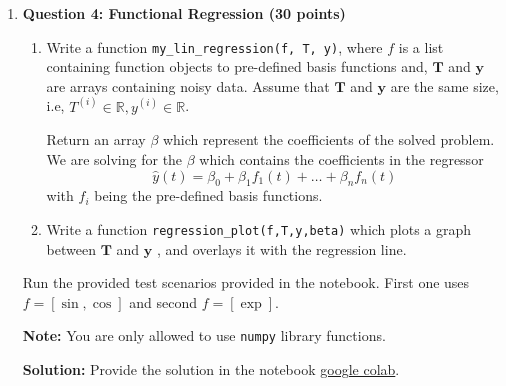 \documentclass[11pt,letterpaper]{article}
\begin{document}
\begin{enumerate}
\begin{enumerate}[label=(\alph*)]
    \emph{Hint}: Minimize least squares in log-space, i.e. $\min \sum_i (\log(\hat{y_i}) - \log(y_i))^2$.
    
    \item Test your code on the generated sample dataset and report the coefficients. A starter code to generate the logarithmic dataset is provided in the notebook.
    \item Plot a graph between $\mathbf{T}$ vs $\mathbf{y}$, and overlay it with the regression line. 
\end{enumerate}
\textbf{Note:} You are only allowed to use \texttt{numpy} library functions.

\textbf{Solution:}
Provide the solution in the notebook \href{https://colab.research.google.com/drive/1lAyQW20omCqQD04MxgjxkkFCrvm4s_bF?usp=sharing}{google colab}.

\clearpage
\item[] \textbf{Question 4: Functional Regression (30 points)}

\begin{enumerate}[label=(\alph*)]
    \item Write a function \texttt{my\_lin\_regression(f, T, y)}, where $f$ is a list containing function objects to pre-defined basis functions and, $\mathbf{T}$ and $\mathbf{y}$ are arrays containing noisy data. Assume that $\mathbf{T}$ and $\mathbf{y}$  are the same size, i.e, $T^{(i)}\in \mathbb{R}, y^{(i)}\in \mathbb{R}$.
    
    Return an array $\beta$ which represent the coefficients of the solved problem. We are solving for the $\beta$ which contains the coefficients in the regressor
    $$\hat{y}(t) = \beta_0 + \beta_1f_1(t) + \dots + \beta_nf_n(t)$$
    with $f_i$ being the pre-defined basis functions.
    \item Write a function \texttt{regression\_plot(f,T,y,beta)} which plots a graph between $\mathbf{T}$ and $\mathbf{y}$ , and overlays it with the regression line.
\end{enumerate}
Run the provided test scenarios provided in the notebook. First one uses $f = [\sin, \cos]$ and second $f = [\exp]$.

\textbf{Note:} You are only allowed to use \texttt{numpy} library functions.

\textbf{Solution:}
Provide the solution in the notebook \href{https://colab.research.google.com/drive/1lAyQW20omCqQD04MxgjxkkFCrvm4s_bF?usp=sharing}{google colab}.



\end{enumerate}
\end{document}
